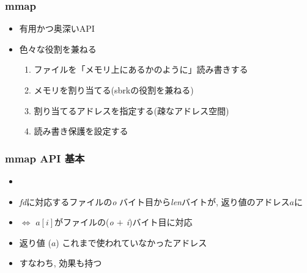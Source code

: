 \documentclass[12pt,dvipdfmx]{beamer}
\begin{document}
\begin{frame}
  \frametitle{mmap}
  \begin{itemize}
  \item 有用かつ奥深いAPI
  \item 色々な役割を兼ねる
    \begin{enumerate}
    \item ファイルを「メモリ上にあるかのように」読み書きする
    \item メモリを割り当てる(sbrkの役割を兼ねる)
    \item 割り当てるアドレスを指定する(疎なアドレス空間)
    \item 読み書き保護を設定する
    \end{enumerate}
  \end{itemize}
\end{frame}

\begin{frame}
  \frametitle{mmap API 基本}
  \begin{itemize}
  \item {}
  \item {} {\it fd}に対応するファイルの{\it o}
    バイト目から{\it len}バイトが,
    返り値のアドレス$a$に
  \item $\iff$  $a[i]$がファイルの({\it o $+$ i})バイト目に対応
  \item 返り値 ($a$) これまで使われていなかったアドレス
  \item すなわち, 効果も持つ
  \end{itemize}
  \begin{center}
  \end{center}
\end{frame}
\end{document}
